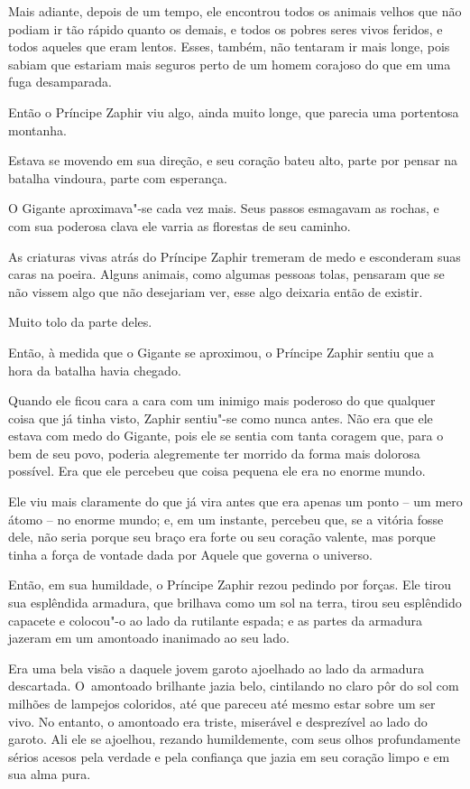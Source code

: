 Mais adiante, depois de um tempo, ele encontrou todos os animais velhos
que não podiam ir tão rápido quanto os demais, e todos os pobres seres
vivos feridos, e todos aqueles que eram lentos. Esses, também, não
tentaram ir mais longe, pois sabiam que estariam mais seguros perto de
um homem corajoso do que em uma fuga desamparada.

Então o Príncipe Zaphir viu algo, ainda muito longe, que parecia uma
portentosa montanha.

Estava se movendo em sua direção, e seu coração bateu alto, parte por
pensar na batalha vindoura, parte com esperança.

O Gigante aproximava"-se cada vez mais. Seus passos esmagavam as rochas,
e com sua poderosa clava ele varria as florestas de seu caminho.

As criaturas vivas atrás do Príncipe Zaphir tremeram de medo e
esconderam suas caras na poeira. Alguns animais, como algumas pessoas
tolas, pensaram que se não vissem algo que não desejariam ver, esse algo
deixaria então de existir.

Muito tolo da parte deles.

Então, à medida que o Gigante se aproximou, o Príncipe Zaphir sentiu que
a hora da batalha havia chegado.

Quando ele ficou cara a cara com um inimigo mais poderoso do que
qualquer coisa que já tinha visto, Zaphir sentiu"-se como nunca antes.
Não era que ele estava com medo do Gigante, pois ele se sentia com tanta
coragem que, para o bem de seu povo, poderia alegremente ter morrido da
forma mais dolorosa possível. Era que ele percebeu que coisa pequena ele
era no enorme mundo.

Ele viu mais claramente do que já vira antes que era apenas um ponto --
um mero átomo -- no enorme mundo; e, em um instante, percebeu que, se a
vitória fosse dele, não seria porque seu braço era forte ou seu coração
valente, mas porque tinha a força de vontade dada por Aquele que governa
o universo.

Então, em sua humildade, o Príncipe Zaphir rezou pedindo por forças. Ele
tirou sua esplêndida armadura, que brilhava como um sol na terra, tirou
seu esplêndido capacete e colocou"-o ao lado da rutilante espada; e as
partes da armadura jazeram em um amontoado inanimado ao seu lado.

Era uma bela visão a daquele jovem garoto ajoelhado ao lado da armadura
descartada. O~amontoado brilhante jazia belo, cintilando no claro pôr do
sol com milhões de lampejos coloridos, até que pareceu até mesmo estar
sobre um ser vivo. No entanto, o amontoado era triste, miserável e
desprezível ao lado do garoto. Ali ele se ajoelhou, rezando
humildemente, com seus olhos profundamente sérios acesos pela verdade e
pela confiança que jazia em seu coração limpo e em sua alma pura.

